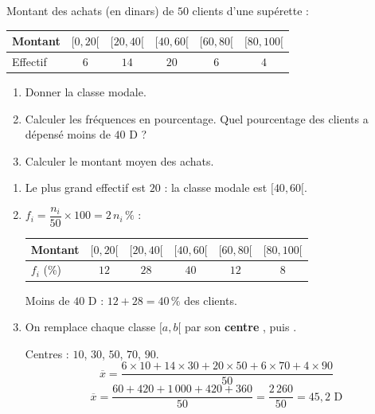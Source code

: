
\newcommand{\R}{\mathbb{R}}
\newcommand{\vect}[1]{\overrightarrow{#1}}

Montant des achats (en dinars) de $50$ clients d'une supérette :
\begin{center}
\begin{tabular}{|l|c|c|c|c|c|}\hline
Montant & $[0,20[$ & $[20,40[$ & $[40,60[$ & $[60,80[$ & $[80,100[$ \\\hline
Effectif & $6$ & $14$ & $20$ & $6$ & $4$ \\\hline
\end{tabular}\end{center}
\begin{enumerate}
  \item Donner la classe modale.
  \item Calculer les fréquences en pourcentage. Quel pourcentage des clients a dépensé moins de $40$ D ?
  \item Calculer le montant moyen des achats.
\end{enumerate}

\begin{enumerate}[itemsep=14pt]
  \item Le plus grand effectif est $20$ : la classe modale est $[40,60[$.

  \item $f_i=\dfrac{n_i}{50}\times100=2\,n_i\,\%$ :
  \begin{center}
  \begin{tabular}{|l|c|c|c|c|c|}\hline
  Montant & $[0,20[$ & $[20,40[$ & $[40,60[$ & $[60,80[$ & $[80,100[$ \\\hline
  $f_i$ (\%) & $12$ & $28$ & $40$ & $12$ & $8$ \\\hline
  \end{tabular}\end{center}
  Moins de $40$ D : $12+28=40\,\%$ des clients.

  \item
  \begin{prop}
  On remplace chaque classe $[a,b[$ par son \textbf{centre} , puis .
  \end{prop}
  Centres : $10$, $30$, $50$, $70$, $90$.
  \[\overline x=\dfrac{6\times10+14\times30+20\times50+6\times70+4\times90}{50}\]
  \[\overline x=\dfrac{60+420+1\,000+420+360}{50}=\dfrac{2\,260}{50}=45{,}2\text{ D}\]
\end{enumerate}
